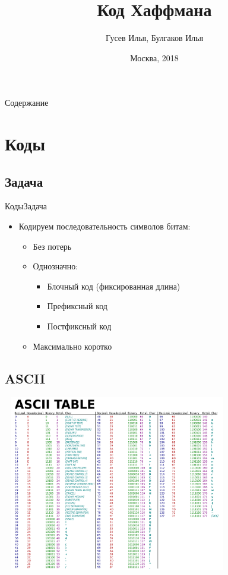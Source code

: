 \documentclass[10pt]{beamer}
\title[\href{https://goo.gl/NRgp8K}{https://goo.gl/NRgp8K} (Term 1)]{Код Хаффмана}
\author[Гусев Илья, Булгаков Илья]{Гусев Илья, Булгаков Илья}
\institute[МФТИ] 
{Московский физико-технический институт\\*}
\date{Москва, 2018}
\begin{document}
\begin{frame}
  \titlepage
\end{frame}

\begin{frame}{Содержание}
\tableofcontents
\end{frame}

\section{Коды}
\subsection{Задача}
\begin{frame}[fragile]{Коды}{Задача}
\begin{itemize}
    \item Кодируем последовательность символов битам:
    \begin{itemize}
        \item Без потерь
        \item Однозначно:
        \begin{itemize}
            \item Блочный код (фиксированная длина)
            \item Префиксный код
            \item Постфиксный код
        \end{itemize}
        \item Максимально коротко
    \end{itemize}
\end{itemize}
\end{frame}

\subsection{ASCII}
\begin{frame}[fragile]
\begin{center}
    \includegraphics[width=10cm, height=7.7cm]{Term_1/Source/Pirctures/ascii.png}
\end{center}
\end{frame}
\end{document}
